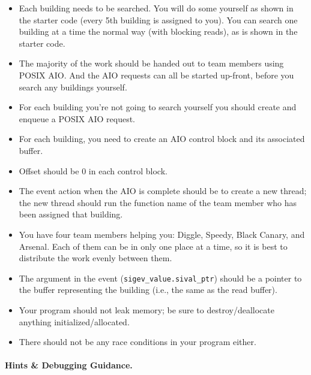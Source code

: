 \documentclass[a4paper]{report}
\begin{document}
\begin{itemize}
	\item Each building needs to be searched. You will do some yourself as shown in the starter code (every 5th building is assigned to you). You can search one building at a time the normal way (with blocking reads), as is shown in the starter code.
	\item The majority of the work should be handed out to team members using POSIX AIO. And the AIO requests can all be started up-front, before you search any buildings yourself.
	\item For each building you're not going to search yourself you should create and enqueue a POSIX AIO request.
	\item For each building, you need to create an AIO control block and its associated buffer.
	\item Offset should be 0 in each control block.
	\item The event action when the AIO is complete should be to create a new thread; the new thread should run the function name of the team member who has been assigned that building.
	\item You have four team members helping you: Diggle, Speedy, Black Canary, and Arsenal. Each of them can be in only one place at a time, so it is best to distribute the work evenly between them.
	\item The argument in the event (\texttt{sigev\_value.sival\_ptr}) should be a pointer to the buffer representing the building (i.e., the same as the read buffer).
	\item Your program should not leak memory; be sure to destroy/deallocate anything initialized/allocated.

	\item There should not be any race conditions in your program either.
\end{itemize}


\paragraph{Hints \& Debugging Guidance.}
\end{document}
